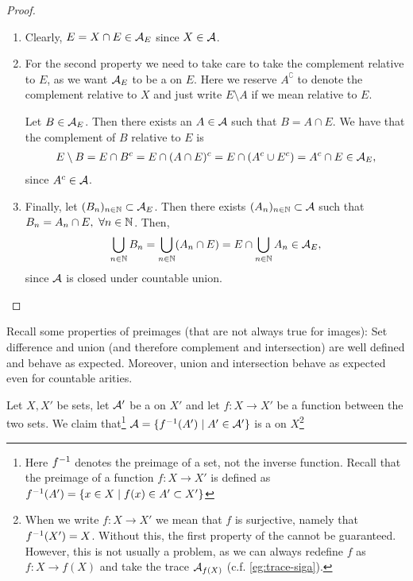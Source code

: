 \begin{proof}$ $\newline
	\begin{enumerate}
		\item Clearly, $E = X \cap E \in \mathcal{A}_E$ since $X \in \mathcal{A}$.
		\item For the second property we need to take care to take the complement relative to $E$, as we want $\mathcal{A}_E$ to be a \siga on $E$. Here we reserve $A^\complement$ to denote the complement relative to $X$ and just write $E \setminus A$ if we mean relative to $E$.
		
		Let $B \in \mathcal{A}_E$. Then there exists an $A \in \mathcal{A}$ such that $B = A \cap E$. We have that the complement of $B$ relative to $E$ is
		\begin{align*}
			E \setminus B = E \cap B^c = E \cap (A \cap E)^c = E \cap (A^c \cup E^c) = A^c \cap E \in \mathcal{A}_E,
		\end{align*}
		since $A^c \in \mathcal{A}$.
		
		\item Finally, let $(B_n)_{n\in\mathbb{N}} \subset \mathcal{A}_E$. Then there exists $(A_n)_{n\in\mathbb{N}} \subset \mathcal{A}$ such that $B_n = A_n \cap E,\ \forall n \in \mathbb{N}$. Then,
		\begin{align*}
			\bigcup_{n \in \mathbb{N}} B_n = \bigcup_{n\in\mathbb{N}} (A_n \cap E) = E \cap \bigcup_{n\in\mathbb{N}} A_n \in \mathcal{A}_E,
		\end{align*}
		since $\mathcal{A}$ is closed under countable union.
	\end{enumerate}
\end{proof}

\begin{eg}
	\label{eg:preimage-siga}
	Recall some properties of preimages (that are not always true for images): Set difference and union (and therefore complement and intersection) are well defined and behave as expected. Moreover, union and intersection behave as expected even for countable arities.
	
	Let $X, X'$ be sets, let $\mathcal{A}'$ be a \siga on $X'$ and let $f : X \to X'$ be a function between the two sets. We claim that\footnote{Here ${f}^{-1}$ denotes the preimage of a set, not the inverse function. Recall that the preimage of a function $f: X \to X'$ is defined as ${f}^{-1}(A') = \{x \in X \mid f(x) \in A' \subset X'\}$} $\mathcal{A} = \{{f}^{-1} (A') \mid A' \in \mathcal{A}'\}$ is a \siga on $X$\footnote{When we write $f: X \to X'$ we mean that $f$ is surjective, namely that ${f}^{-1}(X') = X$. Without this, the first property of the \siga cannot be guaranteed. However, this is not usually a problem, as we can always redefine $f$ as $f:X \to f(X)$ and take the trace \siga $\mathcal{A}_{f(X)}$ (c.f. \autoref{eg:trace-siga}).}
\end{eg}

